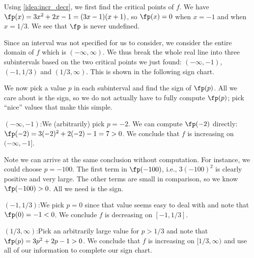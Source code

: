 {Using \autoref{idea:incr_decr}, we first find the critical points of $f$. We have $\fp(x) = 3x^2+2x-1 = (3x-1)(x+1)$, so $\fp(x) = 0$ when $x=-1$ and when $x=1/3$. We see that $\fp$ is never undefined.

Since an interval was not specified for us to consider, we consider the entire domain of $f$ which is $(-\infty,\infty)$. We thus break the whole real line into three subintervals based on the two critical points we just found: $(-\infty,-1)$, $(-1,1/3)$ and $(1/3,\infty)$. This is shown in the following sign chart.

\begin{center}
\end{center}

We now pick a value $p$ in each subinterval and find the sign of $\fp(p)$. All we care about is the sign, so we do not actually have to fully compute $\fp(p)$; pick ``nice'' values that make this simple.

\iflatexml\begin{description}\else\begin{description}[leftmargin=0pt]\fi
\item[Subinterval 1,] $(-\infty,-1)$:\quad We (arbitrarily) pick $p=-2$. We can compute $\fp(-2)$ directly: $\fp(-2) = 3(-2)^2+2(-2)-1=7>0$. We conclude that $f$ is increasing on $(-\infty,-1]$.

Note we can arrive at the same conclusion without computation. For instance, we could choose $p=-100$. The first term in $\fp(-100)$, i.e., $3(-100)^2$ is clearly positive and very large. The other terms are small in comparison, so we know $\fp(-100)>0$. All we need is the sign.

\item[Subinterval 2,] $(-1,1/3)$:\quad We pick $p=0$ since that value seems easy to deal with and note that $\fp(0)=-1<0$. We conclude $f$ is decreasing on $[-1,1/3]$.

\item[Subinterval 3,] $(1/3,\infty)$:\quad Pick an arbitrarily large value for $p>1/3$ and note that $\fp(p)=3p^2+2p-1>0$. We conclude that $f$ is increasing on $[1/3,\infty)$ and use all of our information to complete our sign chart.
\end{description}

\begin{center}
\end{center}


\end{description}}
